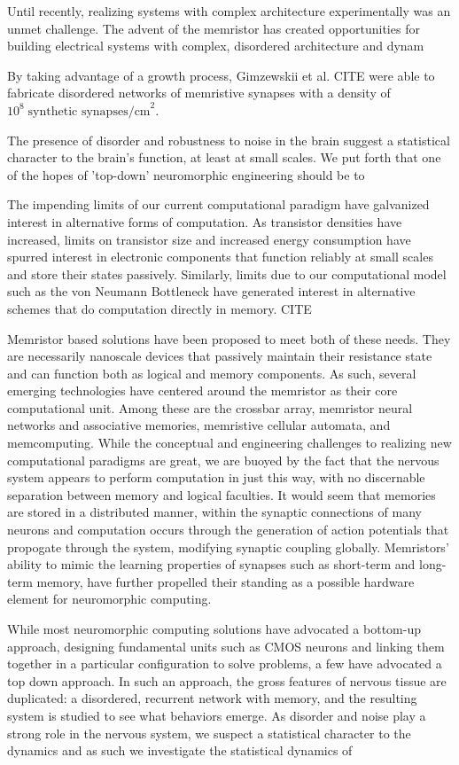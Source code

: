 \documentclass[aps,prl,preprint,groupedaddress]{revtex4-1}
\begin{document}
Until recently, realizing systems with complex architecture
experimentally was an unmet challenge.  The advent of the memristor has
created opportunities for building electrical systems with complex, disordered
architecture and dynam

By taking advantage of a growth process, Gimzewskii et
al. CITE were able to fabricate disordered networks of memristive synapses
with a density of $10^8\; \text{synthetic synapses/cm}^2$.

The presence of disorder and robustness to noise in the brain
suggest a statistical character to the brain's function, at least at small
scales.  We put forth that one of the hopes of 'top-down' neuromorphic
engineering should be to 

The impending limits of our current computational paradigm have galvanized
interest in alternative forms of computation. As transistor densities have
increased, limits on transistor size and increased energy consumption have
spurred interest in electronic components that function reliably at small
scales and store their states passively.  Similarly, limits due to our
computational model such as the von Neumann Bottleneck have generated
interest in alternative schemes that do computation directly in memory.
CITE

Memristor based solutions have been proposed to meet both of these needs.
They are
necessarily nanoscale devices that passively maintain their resistance
state and can function both as logical and memory components.  As such,
several emerging technologies have centered around the memristor as
their core computational unit.  Among these are the crossbar array,
memristor neural networks and associative memories, memristive cellular
automata, and memcomputing.  While the conceptual and engineering
challenges to realizing new computational paradigms are great, we are
buoyed by the fact that the nervous system appears to perform computation
in just this way, with no discernable separation between memory and
logical faculties.  It would seem that memories are stored in a
distributed manner, within the synaptic connections of many neurons
and computation occurs through the generation of action potentials that
propogate through the system, modifying synaptic coupling globally.
Memristors' ability to mimic the learning properties of synapses such as
short-term and long-term memory, have further propelled their standing as
a possible hardware element for neuromorphic computing.

While most neuromorphic computing solutions have advocated a bottom-up
approach, designing fundamental units such as CMOS neurons
and linking them together in a
particular configuration to solve problems, a few have advocated a top
down approach.  In such an approach, the gross features of nervous
tissue are duplicated: a disordered, recurrent network with memory, and
the resulting system is studied to see what behaviors emerge.  As disorder
and noise play a strong role in the nervous system, we suspect a statistical
character to the dynamics and as such we investigate the statistical
dynamics of 
\end{document}
